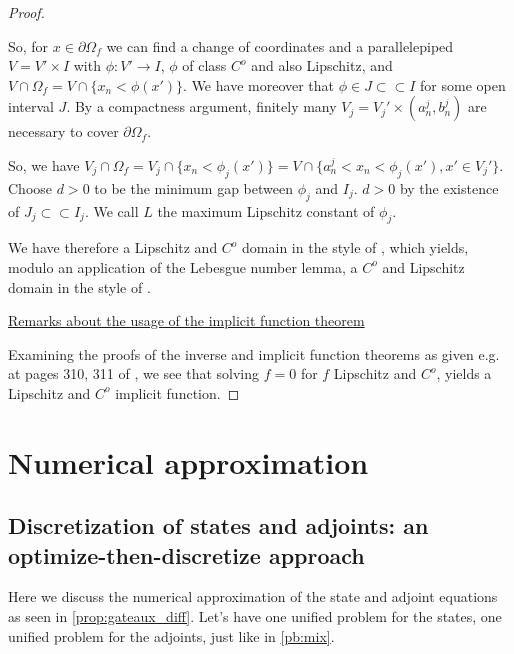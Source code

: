 \documentclass[english,a4paper,10pt,oneside]{scrbook}	%
\theoremstyle{break}
\newenvironment{mproof}[1][\proofname]{%
  \begin{proof}[#1]$ $\par\nobreak\ignorespaces
}{%
  \end{proof}
}
\renewcommand*{\proofname}{Proof}
\theoremstyle{remark}
\newcommand{\cc}{\subset\subset}
\begin{document}
\begin{mproof}
So, for $x \in \partial \Omega_f$ we can find a change of coordinates and a parallelepiped $V = V'\times I$ with $\phi: V'\rightarrow I$, $\phi$ of class $C^o$ and also Lipschitz, and $V\cap 	\Omega_f = V\cap \{x_n<\phi(x')\}$. We have moreover that $\phi \in J \cc I$ for some open interval $J$. By a compactness argument, finitely many $V_j = V_j'\times (a_n^j, b_n^j) $ are necessary to cover $\partial \Omega_f$. 

So, we have $V_j \cap \Omega_f = V_j\cap \{x_n<\phi_j(x')\} = V\cap \{a_n^j<x_n<\phi_j(x'), x' \in V_j'\}$. Choose $d>0$ to be the minimum gap between $\phi_j$ and $I_j$. $d>0$ by the existence of $J_j \cc I_j$. We call $L$ the maximum Lipschitz constant of $\phi_j$. 

We have therefore a Lipschitz and $C^o$ domain in the style of \cite{burenkov}, which yields, modulo an application of the Lebesgue number lemma, a $C^o$ and Lipschitz domain in the style of \cite{grisvard}.

\underline{Remarks about the usage of the implicit function theorem}

Examining the proofs of the inverse and implicit function theorems as given e.g. at pages 310, 311 of \cite{gilardi2}, we see that solving $f=0$ for $f$ Lipschitz and $C^o$, yields a Lipschitz and $C^o$ implicit function.

\end{mproof}

\chapter{Numerical approximation}

\section{Discretization of states and adjoints: an optimize-then-discretize approach}

Here we discuss the numerical approximation of the state and adjoint equations as seen in \cref{prop:gateaux_diff}. Let's have one unified problem for the states, one unified problem for the adjoints, just like in \cref{pb:mix}.
\end{document}

